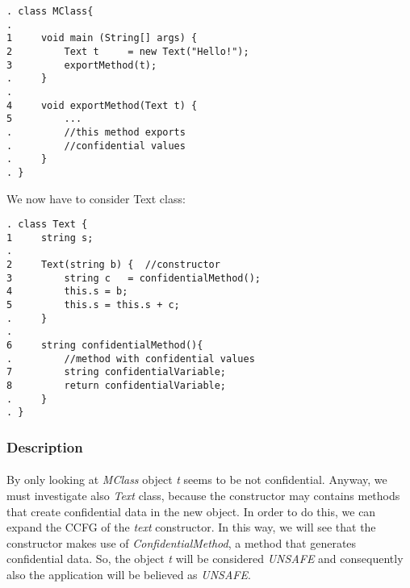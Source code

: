 \documentclass[letterpaper,twocolumn,10pt]{article}
\begin{document}
\begin{verbatim}
. class MClass{
.
1     void main (String[] args) {	    
2         Text t	 = new Text("Hello!");
3         exportMethod(t);
.     }
.
4     void exportMethod(Text t) {        
5         ...
.         //this method exports 
.         //confidential values
.     }
. }
\end{verbatim}

\noindent We now have to consider Text class:
\begin{verbatim}
. class Text {
1     string s;
.	
2     Text(string b) { 	//constructor
3         string c	 = confidentialMethod();
4         this.s = b;
5         this.s = this.s + c;
.     }
.	
6     string confidentialMethod(){ 
.         //method with confidential values
7         string confidentialVariable;		
8         return confidentialVariable;
.     }
. }
\end{verbatim}

%
%	
%

\subsubsection{Description}
\paragraph{}
By only looking at \emph{MClass} object \emph{t} seems to be not confidential. Anyway, we must investigate also \emph{Text} class, because the constructor may contains methods that create confidential data in the new object. In order to do this, we can expand the CCFG of the \emph{text} constructor. In this way, we will see that the constructor makes use of \emph{ConfidentialMethod}, a method that generates confidential data. So, the object \emph{t} will be considered \emph{UNSAFE} and consequently also the application will be believed as \emph{UNSAFE}.
\end{document}
